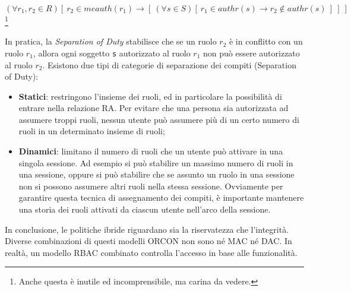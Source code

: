 \[
    (\forall r_1, r_2 \in R) [ \ r_2 \in meauth(r_1) \rightarrow
            [ \ (\forall s \in S) [ \ r_1 \in authr(s) \rightarrow r_2 \notin authr(s) \ ] \ ] \ ]
\] \footnote{Anche questa è inutile ed incomprensibile, ma carina da vedere.}

In pratica, la \textit{Separation of Duty} stabilisce che
se un ruolo \(r_2\) è in conflitto con un ruolo \(r_1\),
allora ogni soggetto \verb|s| autorizzato al ruolo \(r_1\)
non può essere autorizzato al ruolo \(r_2\).
Esistono due tipi di categorie di separazione dei compiti (Separation of Duty):

\begin{itemize}
    \item \textbf{Statici}: restringono l'insieme dei ruoli, ed in particolare
          la possibilità di entrare nella
          relazione RA. Per evitare che una persona sia autorizzata ad assumere
          troppi ruoli, nessun
          utente può assumere più di un certo numero di ruoli in un determinato
          insieme di ruoli;
    \item \textbf{Dinamici}: limitano il numero di ruoli che un utente può
          attivare in una singola sessione.
          Ad esempio si può stabilire un massimo numero di ruoli in una sessione,
          oppure si può stabilire che se assunto un ruolo in una sessione non
          si possono assumere altri ruoli nella stessa
          sessione. Ovviamente per garantire questa tecnica di assegnamento
          dei compiti, è
          importante mantenere una storia dei ruoli attivati da ciascun
          utente nell'arco della sessione.
\end{itemize}

In conclusione, le politiche ibride riguardano sia la riservatezza che l'integrità.
Diverse combinazioni di questi modelli ORCON non sono né MAC né DAC.
In realtà, un modello RBAC combinato controlla l'accesso in base alle funzionalità.